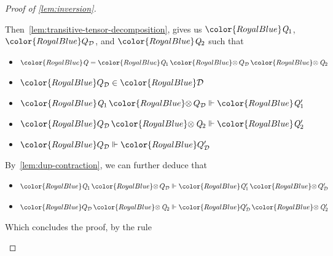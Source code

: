 \documentclass[acmsmall,usenames,dvipsnames,natbib=false,acmthm=false,screen]{acmart}
\newcommand{\constraintcolour}{\color{RoyalBlue}}
\newcommand{\constraintfont}[1]{{\constraintcolour#1}}
\newcommand{\constraintop}[1]{\mathop{\constraintfont{#1}}}
\newcommand{\qtensor}{\constraintop{\otimes}}
\theoremstyle{acmplain}
\theoremstyle{acmdefinition}
\begin{document}
\begin{proof}[Proof of \cref{lem:inversion}]
\begin{itemize}
    Then~\cref{lem:transitive-tensor-decomposition}, gives us
    $  \constraintfont{ \ottnt{Q_{{\mathrm{1}}}} }  $, $  \constraintfont{ Q_{\mathcal{D} } }  $, and $  \constraintfont{ \ottnt{Q_{{\mathrm{2}}}} }  $ such that
    \begin{itemize}
    \item $  \constraintfont{ \ottnt{Q} }   =   \constraintfont{ \ottnt{Q_{{\mathrm{1}}}}  \qtensor  Q_{\mathcal{D} }  \qtensor  \ottnt{Q_{{\mathrm{2}}}} }  $
    \item $  \constraintfont{ Q_{\mathcal{D} } }   \in  \constraintfont{\mathcal{D} } $
    \item $ \constraintfont{ \ottnt{Q_{{\mathrm{1}}}}  \qtensor  Q_{\mathcal{D} } }   \Vdash   \constraintfont{ \ottnt{Q'_{{\mathrm{1}}}} } $
    \item $ \constraintfont{ Q_{\mathcal{D} }  \qtensor  \ottnt{Q_{{\mathrm{2}}}} }   \Vdash   \constraintfont{ \ottnt{Q'_{{\mathrm{2}}}} } $
    \item $ \constraintfont{ Q_{\mathcal{D} } }   \Vdash   \constraintfont{ Q_{\mathcal{D} }' } $
    \end{itemize}
    By~\ref{lem:dup-contraction}, we can further deduce that
    \begin{itemize}
    \item $ \constraintfont{ \ottnt{Q_{{\mathrm{1}}}}  \qtensor  Q_{\mathcal{D} } }   \Vdash   \constraintfont{ \ottnt{Q'_{{\mathrm{1}}}}  \qtensor  Q_{\mathcal{D} }' } $
    \item $ \constraintfont{ Q_{\mathcal{D} }  \qtensor  \ottnt{Q_{{\mathrm{2}}}} }   \Vdash   \constraintfont{ Q_{\mathcal{D} }'  \qtensor  \ottnt{Q'_{{\mathrm{2}}}} } $
    \end{itemize}
    Which concludes the proof, by the  rule
  \end{itemize}
\end{proof}
\end{document}
